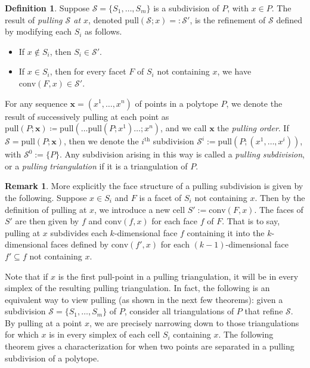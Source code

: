 \documentclass[12pt]{amsart}
\theoremstyle{definition}
\newtheorem{definition}[theorem]{Definition}
\newtheorem{remark}[theorem]{Remark}
\newcommand{\defn}[1]{\emph{\color{blue} #1}}
\newcommand\bx{\mathbf{x}}
\newcommand\calS{\mathcal{S}}
\newcommand\conv{\mathrm{conv}}
\newcommand\pull{\mathrm{pull}}
\begin{document}
\begin{definition}
    Suppose $\calS=\{S_1,\dots,S_m\}$ is a subdivision of $P$, with $x \in P$.
    The result of \defn{pulling $\calS$ at $x$}, denoted $\pull(\calS; x) =: \calS'$, is the refinement of $\calS$ defined by modifying each $S_i$ as follows.
    \begin{itemize}
        \item If $x\notin S_i$, then $S_i\in\calS'$.
        \item If $x\in S_i$, then for every facet $F$ of $S_i$ not containing $x$, we have $\conv(F,x)\in\calS'$.
    \end{itemize}

    For any sequence $\bx = (x^1,\dots, x^n)$ of points in a polytope $P$, we denote the result of successively pulling at each point as $\pull(P;\bx) \coloneq \pull( \dots \pull(P; x^1) \dots; x^n)$, and we call $\bx$ the \defn{pulling order}.
    If $\calS = \pull(P;\bx)$, then we denote the $i^{\text{th}}$ subdivision $\calS^i := \pull(P;(x^1,\dots,x^i))$, with $\calS^0 := \{P\}$.
    Any subdivision arising in this way is called a \defn{pulling subdivision}, or a \defn{pulling triangulation} if it is a triangulation of $P$.
\end{definition}

\begin{remark}\label{remark:face_pulling}
More explicitly the face structure of a pulling subdivision is given by the following.
Suppose $x\in S_i$ and $F$ is a facet of $S_i$ not containing $x$.
Then by the definition of pulling at $x$, we introduce a new cell $S':= \conv(F,x)$.
The faces of $S'$ are then given by $f$ and $\conv(f,x)$ for each face $f$ of $F$.
That is to say, pulling at $x$ subdivides each $k$-dimensional face $f$ containing it into the $k$-dimensional faces defined by $\conv(f',x)$ for each $(k-1)$-dimensional face $f'\subseteq f$ not containing $x$.
\end{remark}

Note that if $x$ is the first pull-point in a pulling triangulation, it will be in every simplex of the resulting pulling triangulation.
In fact, the following is an equivalent way to view pulling (as shown in the next few theorems): given a subdivision $\calS = \{S_1,\dots,S_m\}$ of $P$, consider all triangulations of $P$ that refine $\calS$.
By pulling at a point $x$, we are precisely narrowing down to those triangulations for which $x$ is in every simplex of each cell $S_i$ containing $x$.
The following theorem gives a characterization for when two points are separated in a pulling subdivision of a polytope.
\end{document}
